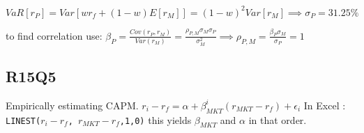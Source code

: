 $VaR[r_P] = Var[w r_f + (1-w) E[r_M]] = (1-w)^2 Var[r_M] \implies \sigma_P = 31.25\% $ 

to find correlation use: 
$\beta_P = \frac{Cov(r_P, r_M)}{Var(r_M)}=\frac{\rho_{P,M} \sigma_M \sigma_P }{\sigma_M^2} \implies \rho_{P,M}=\frac{\beta_P \sigma_M}{\sigma_P} = 1$

\subsection*{R15Q5}
Empirically estimating CAPM.  $r_i-r_f = \alpha + \beta_{MKT}^i (r_{MKT}-r_f) + \epsilon_i$  In Excel : \texttt{LINEST($r_i-r_f$, $r_{MKT}-r_f$,1,0)} this yields $\beta_{MKT}$ and $\alpha$ in that order.